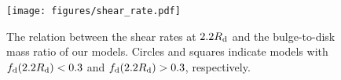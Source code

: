 \begin{figure}
\texttt{[image: figures/shear\_rate.pdf]}
\caption{The relation between the shear rates at $2.2R_{\rm d}$ and the bulge-to-disk mass ratio of our models. 
Circles and squares indicate models with $f_{\rm d}(2.2R_{\rm d})<0.3$ and $f_{\rm d}(2.2R_{\rm d})>0.3$,
respectively. \label{fig:shear_rate}}
\end{figure}



